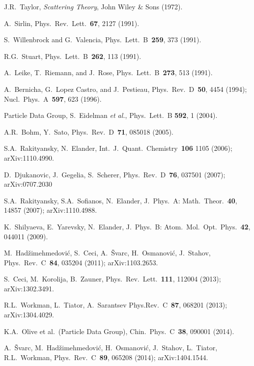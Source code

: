 \documentclass[12pt]{article}
\begin{document}
\begin{thebibliography}{99}



 J.R.~Taylor, {\it Scattering Theory}, John Wiley \& Sons
(1972). 

 A.~Sirlin, Phys.~Rev.~Lett.~{\bf 67}, 2127 (1991).

 S.~Willenbrock and G.~Valencia, 
Phys.~Lett.~B~{\bf 259}, 373 (1991).

 R.G.~Stuart, Phys.~Lett.~B~{\bf 262}, 113 (1991).

 A.~Leike, T.~Riemann, and J.~Rose, Phys.~Lett.~B~{\bf 273}, 
513 (1991).

 A.~Bernicha, G.~Lopez Castro, and J.~Pestieau, 
Phys.~Rev.~D~{\bf 50}, 4454 (1994); 
Nucl.~Phys.~A~{\bf 597}, 623 (1996).

 Particle Data Group, S.~Eidelman {\it et al.}, Phys.~Lett.~B
{\bf 592}, 1 (2004).

 A.R.~Bohm, Y.~Sato, Phys.~Rev.~D~{\bf 71},
085018 (2005).

 S.A.~Rakityansky, N.~Elander, 
Int.~J.~Quant.~Chemistry~{\bf 106} 1105 (2006); {\sf arXiv:1110.4990}.

 D.~Djukanovic, J.~Gegelia, S.~Scherer, 
Phys.~Rev.~D~{\bf 76}, 037501 (2007); {\sf arXiv:0707.2030}

 S.A.~Rakityansky, S.A.~Sofianos, N.~Elander, 
J.~Phys.~A: Math.~Theor.~{\bf 40}, 14857 (2007); {\sf arXiv:1110.4988}.

 K.~Shilyaeva, E.~Yarevsky, N.~Elander, 
J.~Phys.~B: Atom.~Mol.~Opt.~Phys.~{\bf 42}, 044011 (2009).

 M.~Had\v{z}imehmedovi\'c, S.~Ceci, 
A.~\v{S}varc, H.~Osmanovi\'c, J.~Stahov, Phys.~Rev.~C~{\bf 84}, 035204 (2011);
{\sf arXiv:1103.2653}.

 S.~Ceci, M.~Korolija, B.~Zauner, 
Phys.~Rev.~Lett.~{\bf 111}, 112004 (2013); {\sf arXiv:1302.3491}.

 R.L.~Workman, L.~Tiator, A.~Sarantsev
Phys.Rev.~C~{\bf 87}, 068201 (2013); {\sf arXiv:1304.4029}.

 K.A.~Olive et al.~(Particle Data Group), 
Chin.~Phys.~C~{\bf 38}, 090001 (2014).

 A.~\v{S}varc, M.~Had\v{z}imehmedovi\'c, 
H.~Osmanovi\'c, J.~Stahov, L.~Tiator, R.L.~Workman,
Phys.~Rev.~C~{\bf 89}, 065208 (2014); {\sf arXiv:1404.1544}.


\end{thebibliography}
\end{document}
